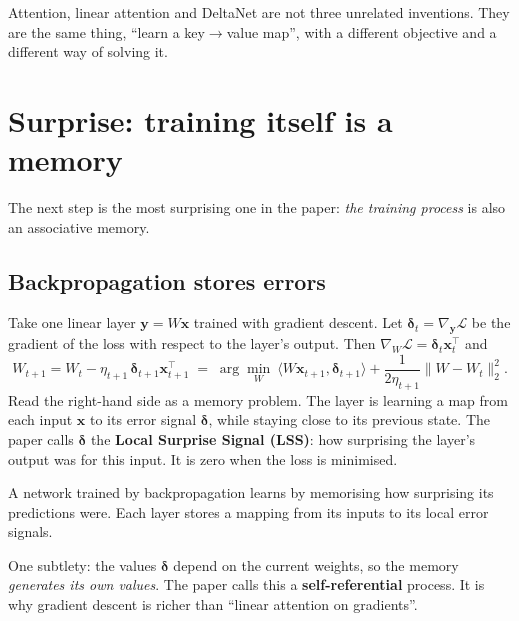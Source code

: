 \documentclass[11pt,a4paper]{article}
\newcommand{\Lc}{\mathcal{L}}
\newcommand{\bx}{\mathbf{x}}
\newcommand{\by}{\mathbf{y}}
\newcommand{\inner}[2]{\langle #1, #2\rangle}
\begin{document}
\begin{plain}
Attention, linear attention and DeltaNet are not three unrelated inventions. They are the same thing, ``learn a key$\to$value map'', with a different objective and a different way of solving it.
\end{plain}

\section{Surprise: training itself is a memory}

The next step is the most surprising one in the paper: \emph{the training process} is also an associative memory.

\subsection{Backpropagation stores errors}
Take one linear layer $\by = W\bx$ trained with gradient descent. Let $\boldsymbol\delta_t = \nabla_{\by}\Lc$ be the gradient of the loss with respect to the layer's output. Then $\nabla_W\Lc = \boldsymbol\delta_t\bx_t^{\top}$ and
\begin{equation}
  W_{t+1} = W_t - \eta_{t+1}\,\boldsymbol\delta_{t+1}\bx_{t+1}^{\top}
  \;=\; \arg\min_{W}\ \inner{W\bx_{t+1}}{\boldsymbol\delta_{t+1}} + \frac{1}{2\eta_{t+1}}\|W - W_t\|_2^2 .
\end{equation}
Read the right-hand side as a memory problem. The layer is learning a map from each input $\bx$ to its error signal $\boldsymbol\delta$, while staying close to its previous state. The paper calls $\boldsymbol\delta$ the \textbf{Local Surprise Signal (LSS)}: how surprising the layer's output was for this input. It is zero when the loss is minimised.

\begin{keyidea}
A network trained by backpropagation learns by memorising how surprising its predictions were. Each layer stores a mapping from its inputs to its local error signals.
\end{keyidea}

One subtlety: the values $\boldsymbol\delta$ depend on the current weights, so the memory \emph{generates its own values}. The paper calls this a \textbf{self-referential} process. It is why gradient descent is richer than ``linear attention on gradients''.
\end{document}
